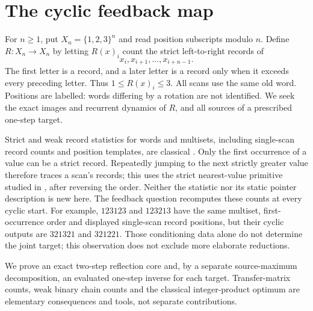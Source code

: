 \section{The cyclic feedback map}
For $n\ge1$, put $X_n=\{1,2,3\}^n$ and read position subscripts modulo
$n$. Define $R:X_n\to X_n$ by letting $R(x)_i$ count the strict
left-to-right records of
\[
 x_i,x_{i+1},\ldots,x_{i+n-1}.
\]
The first letter is a record, and a later letter is a record only when it
exceeds every preceding letter. Thus $1\le R(x)_i\le3$. All scans use the
same old word. Positions are labelled: words differing by a rotation are
not identified. We seek the exact images and recurrent dynamics of $R$,
and all sources of a prescribed one-step target.

Strict and weak record statistics for words and multisets, including
single-scan record counts and position templates, are classical
\citep{myers2008maxima}. Only the first occurrence of a value can be a
strict record. Repeatedly jumping to the next strictly greater value
therefore traces a scan's records; this uses the strict nearest-value
primitive studied in \citet{berkman1993nearest}, after reversing the order.
Neither the statistic nor its static pointer description is new here.
The feedback question recomputes these counts at every cyclic start.
For example, $123123$ and $123213$ have the same multiset, first-occurrence
order and displayed single-scan record positions, but their cyclic outputs
are $321321$ and $321221$. Those conditioning data alone do not determine
the joint target; this observation does not exclude more elaborate reductions.

We prove an exact two-step reflection core and, by a separate source-maximum
decomposition, an evaluated one-step inverse for each target. Transfer-matrix
counts, weak binary chain counts and the classical integer-product optimum
are elementary consequences and tools, not separate contributions.
